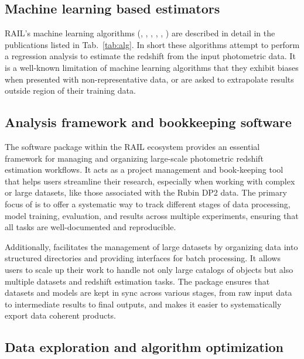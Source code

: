 \subsection{Machine learning based estimators}
\label{sec:method:machine_learning}

RAIL’s machine learning algorithms (, , , , , ) are described in detail in the publications listed in Tab.~\ref{tab:alg}.  In short these algorithms attempt to perform a regression analysis to estimate the redshift from the input photometric data.   It is a well-known limitation of machine learning algorithms that they exhibit biases when presented with non-representative data, or are asked to extrapolate results outside region of their training data.


\subsection{Analysis framework and bookkeeping software}
\label{sec:method:rail_project}

The  software package within the RAIL ecosystem provides an essential framework for managing and organizing large-scale photometric redshift estimation workflows.  It acts as a project management and book-keeping tool that helps users streamline their research, especially when working with complex or large datasets, like those associated with the Rubin DP2 data.  The primary focus of  is to offer a systematic way to track different stages of data processing, model training, evaluation, and results across multiple experiments, ensuring that all tasks are well-documented and reproducible.

Additionally,  facilitates the management of large datasets by organizing data into structured directories and providing interfaces for batch processing.  It allows users to scale up their work to handle not only large catalogs of objects but also multiple datasets and redshift estimation tasks.  The package ensures that datasets and models are kept in sync across various stages, from raw input data to intermediate results to final outputs, and makes it easier to systematically export data coherent products.


\subsection{Data exploration and algorithm optimization}
\label{sec:method:optimization}


